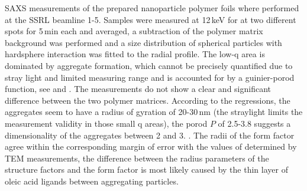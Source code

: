 SAXS measurements of the prepared nanoparticle polymer foils where performed at the SSRL beamline 1-5. Samples were measured at 12\,keV for at two different spots for 5\,min each and averaged, a subtraction of the polymer matrix background was performed and a size distribution of spherical particles with hardsphere interaction was fitted to the radial profile. The low-q area is dominated by aggregate formation, which cannot be precisely quantified due to stray light and limited measuring range and is accounted for by a guinier-porod function, see   and   \cite{percus1958,feigin1987,Ilavsky2009}.
The measurements do not show a clear and significant difference between the two polymer matrices. According to the regressions, the aggregates seem to have a radius of gyration of 20-30\,nm (the straylight limits the measurement validity in those small q areas), the porod $P$ of 2.5-3.8 suggests a dimensionality of the aggregates between 2 and 3.  \cite{feigin1987,lili2005}. The radii of the form factor agree within the corresponding margin of error with the values of determined by TEM measurements, the difference between the radius parameters of the structure factors and the form factor is most likely caused by the thin layer of oleic acid ligands between aggregating particles.


